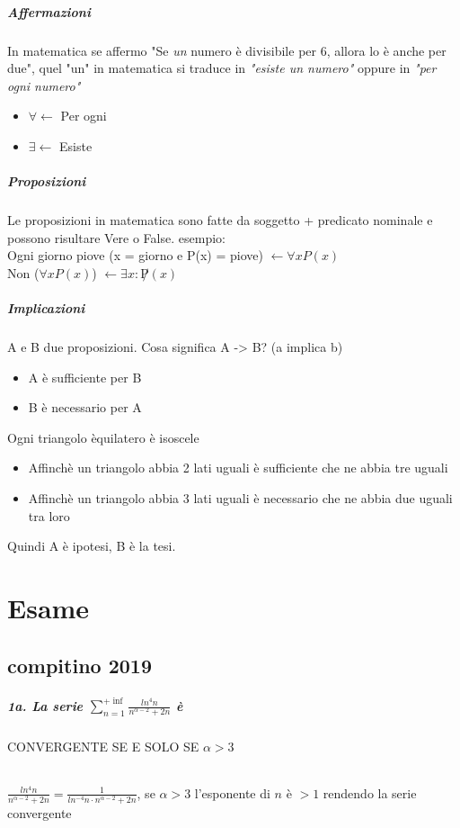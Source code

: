 \documentclass[12pt, a4paper, openany]{book}
\begin{document}
\paragraph*{Affermazioni} In matematica se affermo "Se \emph{un} numero è divisibile per 6, allora lo è anche per due", quel "un" in matematica si traduce in \emph{"esiste un numero"} oppure in \emph{"per ogni numero"} 
\begin{itemize}
    \item $\forall \leftarrow$ Per ogni
    \item $\exists \leftarrow$ Esiste
\end{itemize}

\paragraph*{Proposizioni}
Le proposizioni in matematica sono fatte da soggetto + predicato nominale e possono risultare Vere o False.
esempio: 
\\Ogni giorno piove (x = giorno e P(x) = piove) $\leftarrow \forall x P(x)$
\\Non ($\forall x P(x)$) $\leftarrow \exists x : \not P(x)$

\paragraph*{Implicazioni}
A e B due proposizioni. Cosa significa A -> B? (a implica b)
\begin{itemize}
    \item A è sufficiente per B
    \item B è necessario per A
\end{itemize}
Ogni triangolo èquilatero è isoscele
\begin{itemize}
    \item Affinchè un triangolo abbia 2 lati uguali è sufficiente che ne abbia tre uguali
    \item Affinchè un triangolo abbia 3 lati uguali è necessario che ne abbia due uguali tra loro
\end{itemize}
Quindi A è ipotesi, B è la tesi.
\chapter{Esame}
\section{compitino 2019}
\paragraph{1a. La serie $\sum^{+\inf}_{n=1} \frac{ln^4n}{n^{\alpha - 2} + 2n}$ è} CONVERGENTE SE E SOLO SE $\alpha > 3$
\subparagraph{}
$\frac{ln^4n}{n^{\alpha - 2} + 2n} = \frac{1}{ln^{-4}n\cdot n^{\alpha-2}+2n} $,  se $\alpha >3$ l'esponente di $n$ è $>1$ rendendo la serie convergente
\end{document}
